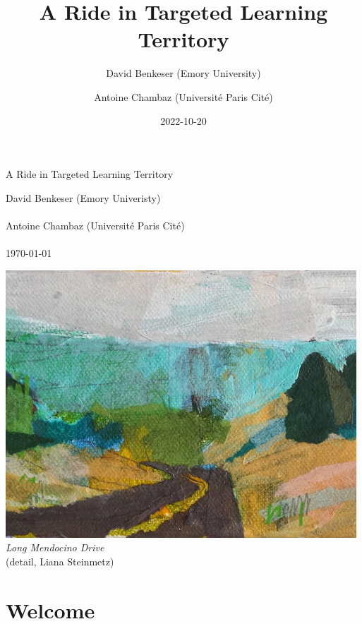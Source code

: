 \documentclass[
  11pt,
  openright,twoside]{book}
\title{A Ride in Targeted Learning Territory}
\author{David Benkeser (Emory University) \and Antoine Chambaz (Université Paris Cité)}
\date{2022-10-20}
\theoremstyle{definition}
\theoremstyle{definition}
\theoremstyle{definition}
\theoremstyle{definition}
\theoremstyle{remark}
\begin{document}
\maketitle

\begin{titlepage}
  \centering
  \vspace*{3cm}
  \begin{Huge}
    {\color{WildStrawberry}{\hrule}}
    \vspace{1cm}
    A Ride in Targeted Learning Territory
    \vspace{1cm}
    {\color{WildStrawberry}{\hrule}}
  \end{Huge}
  \vspace*{1cm}  
  \begin{large}
    David Benkeser (Emory Univeristy)\\~\\
    Antoine Chambaz (Universit\'e Paris Cité)\\~\\
    \today\par
  \end{large}
  \vspace*{1cm}
  \includegraphics{cover.jpg}\\
  \textit{Long Mendocino Drive}\\
  (detail, Liana Steinmetz)
\end{titlepage}




{
\setcounter{tocdepth}{1}
\tableofcontents
}
\hypertarget{welcome}{%
\chapter*{Welcome}\label{welcome}}
\end{document}
